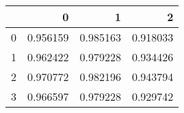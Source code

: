 \begin{tabular}{lrrr}
\toprule
{} &         0 &         1 &         2 \\
\midrule
0 &  0.956159 &  0.985163 &  0.918033 \\
1 &  0.962422 &  0.979228 &  0.934426 \\
2 &  0.970772 &  0.982196 &  0.943794 \\
3 &  0.966597 &  0.979228 &  0.929742 \\
\bottomrule
\end{tabular}
